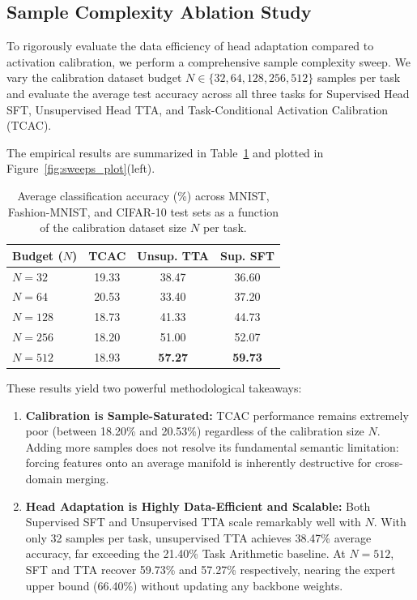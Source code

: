 \documentclass{article}
\theoremstyle{plain}
\theoremstyle{definition}
\theoremstyle{remark}
\begin{document}
\subsection{Sample Complexity Ablation Study}
To rigorously evaluate the data efficiency of head adaptation compared to activation calibration, we perform a comprehensive sample complexity sweep. We vary the calibration dataset budget $N \in \{32, 64, 128, 256, 512\}$ samples per task and evaluate the average test accuracy across all three tasks for Supervised Head SFT, Unsupervised Head TTA, and Task-Conditional Activation Calibration (TCAC).

The empirical results are summarized in Table~\ref{tab:sample_complexity} and plotted in Figure~\ref{fig:sweeps_plot}(left).

\begin{table}[h]
\caption{Average classification accuracy (\%) across MNIST, Fashion-MNIST, and CIFAR-10 test sets as a function of the calibration dataset size $N$ per task.}
\label{tab:sample_complexity}
\begin{center}
\footnotesize
\setlength{\tabcolsep}{3.0pt}
\begin{tabular}{lccc}
\toprule
\textbf{Budget ($N$)} & \textbf{TCAC} & \textbf{Unsup. TTA} & \textbf{Sup. SFT} \\
\midrule
$N=32$ & 19.33 & 38.47 & 36.60 \\
$N=64$ & 20.53 & 33.40 & 37.20 \\
$N=128$ & 18.73 & 41.33 & 44.73 \\
$N=256$ & 18.20 & 51.00 & 52.07 \\
$N=512$ & 18.93 & \textbf{57.27} & \textbf{59.73} \\
\bottomrule
\end{tabular}
\end{center}
\end{table}

These results yield two powerful methodological takeaways:
\begin{enumerate}
  \item \textbf{Calibration is Sample-Saturated:} TCAC performance remains extremely poor (between 18.20\% and 20.53\%) regardless of the calibration size $N$. Adding more samples does not resolve its fundamental semantic limitation: forcing features onto an average manifold is inherently destructive for cross-domain merging.
  \item \textbf{Head Adaptation is Highly Data-Efficient and Scalable:} Both Supervised SFT and Unsupervised TTA scale remarkably well with $N$. With only 32 samples per task, unsupervised TTA achieves 38.47\% average accuracy, far exceeding the 21.40\% Task Arithmetic baseline. At $N=512$, SFT and TTA recover 59.73\% and 57.27\% respectively, nearing the expert upper bound (66.40\%) without updating any backbone weights.
\end{enumerate}
\end{document}
